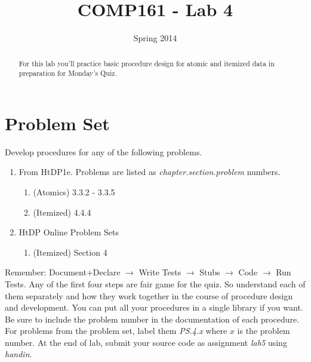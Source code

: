 \documentclass[]{tufte-handout}
\title{COMP161 - Lab 4}
\author{}
\date{Spring 2014}
\begin{document}
\maketitle

\begin{abstract}
For this lab you'll practice basic procedure design for atomic and itemized data in preparation for Monday's Quiz.
\end{abstract}

\section{Problem Set}

Develop procedures for any of the following problems. 
\begin{enumerate}
\item From HtDP1e. Problems are listed as \textit{chapter.section.problem} numbers.
\begin{enumerate}
\item (Atomics) 3.3.2 - 3.3.5
\item (Itemized) 4.4.4
\end{enumerate}
\item HtDP Online Problem Sets
\begin{enumerate}
\item (Itemized) Section 4
\end{enumerate}
\end{enumerate}
 
Remember: Document+Declare $\rightarrow$ Write Tests $\rightarrow$ Stubs $\rightarrow$ Code $\rightarrow$ Run Tests. Any of the first four steps are fair game for the quiz. So understand each of them separately and how they work together in the course of procedure design and development. You can put all your procedures in a single library if you want.  Be sure to include the problem number in the documentation of each procedure. For problems from the problem set, label them \textit{PS.4.x} where $x$ is the problem number. At the end of lab, submit your source code as assignment \textit{lab5} using \textit{handin}.
\end{document}
